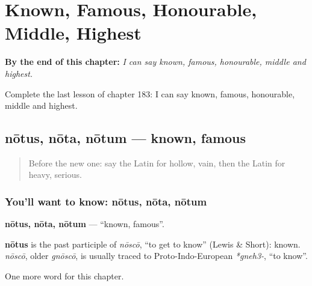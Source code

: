 
\chapter{Known, Famous, Honourable, Middle, Highest}
\label{ch:la-known-famous-honourable-middle-highest}

\begin{chapteropening}
\textbf{By the end of this chapter:} \emph{I can say known, famous, honourable, middle and highest.}

Complete the last lesson of chapter 183: I can say known, famous, honourable, middle and highest.
\end{chapteropening}

\section[nōtus, nōta, nōtum]{nōtus, nōta, nōtum — known, famous}

\label{lesson:LA-C183-notus}



\begin{quote}
Before the new one: say the Latin for hollow, vain, then the Latin for heavy, serious.
\end{quote}

\subsection*{You'll want to know: nōtus, nōta, nōtum}
\textbf{nōtus, nōta, nōtum} — \textquotedblleft{}known, famous\textquotedblright{}.

\begin{cousinweb}
\textbf{nōtus} is the past participle of \emph{nōscō}, \textquotedblleft{}to get to know\textquotedblright{} (Lewis \& Short): known. \emph{nōscō}, older \emph{gnōscō}, is usually traced to Proto-Indo-European \emph{*gneh3-}, \textquotedblleft{}to know\textquotedblright{}.
\end{cousinweb}

\begin{grammarlens}[title={What you've built}]
One more word for this chapter.
\end{grammarlens}

